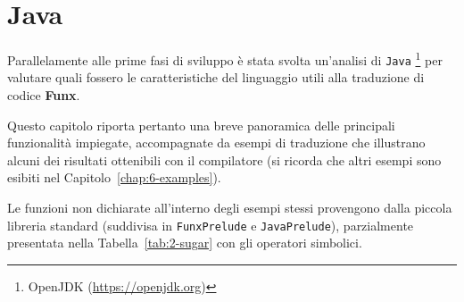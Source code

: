 \chapter{Java}
\label{chap:4-java}

Parallelamente alle prime fasi di sviluppo è stata svolta un'analisi di \texttt{Java}%
\footnote{OpenJDK (\url{https://openjdk.org})}
per valutare quali fossero le caratteristiche del linguaggio utili alla traduzione di codice \textbf{Funx}.

\noindent Questo capitolo riporta pertanto una breve panoramica delle principali funzionalità impiegate,
accompagnate da esempi di traduzione che illustrano alcuni dei risultati ottenibili con il compilatore
(si ricorda che altri esempi sono esibiti nel Capitolo~\ref{chap:6-examples}).

Le funzioni non dichiarate all'interno degli esempi stessi provengono dalla piccola libreria standard
(suddivisa in \texttt{FunxPrelude} e \texttt{JavaPrelude}),
parzialmente presentata nella Tabella~\ref{tab:2-sugar} con gli operatori simbolici.



\newpage



\newpage

